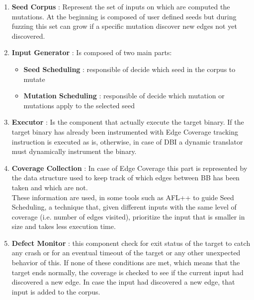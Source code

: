     \begin{enumerate}
        \item \textbf{Seed Corpus} : Represent the set of inputs on which are computed the mutations. 
            At the beginning is composed of user defined seeds but during fuzzing this set can grow if a specific mutation discover new edges not yet discovered.
        \item \textbf{Input Generator} : Is composed of two main parts:
            \begin{itemize}
                \item \small \textbf{Seed Scheduling} : responsible of decide which seed in the corpus to mutate
                \item \small \textbf{Mutation Scheduling} : responsible of decide which mutation or mutations apply to the selected seed
            \end{itemize}
        \item \textbf{Executor} : Is the component that actually execute the target binary. 
            If the target binary has already been instrumented with Edge Coverage tracking instruction is executed as is, 
            otherwise, in case of \gls{DBI} a dynamic translator must dynamically instrument the binary.
        \item \textbf{Coverage Collection} : In case of Edge Coverage this part is represented by the data structure used 
            to keep track of which edges between \gls{BB} has been taken and which are not.\\
            These information are used, in some tools such as AFL++ \cite{aflplusplus} to guide Seed Scheduling, 
            a technique that, given different inputs with the same level of coverage (i.e. number of edges visited), 
            prioritize the input that is smaller in size and takes less execution time.
        \item \textbf{Defect Monitor} : this component check for exit status of the target to catch any crash or 
            for an eventual timeout of the target or any other unexpected behavior of this.
            If none of these conditions are met, which means that the target ends normally, the coverage is checked 
            to see if the current input had discovered a new edge. 
            In case the input had discovered a new edge, that input is added to the corpus.
        \end{enumerate}
        
